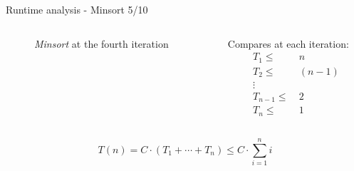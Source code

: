 \begin{frame}{Runtime analysis - Minsort 5/10}
  \begin{columns}
    \begin{column}{0.55\textwidth}
      \begin{figure}[!h]%
        \begin{adjustbox}{width=\linewidth}%
        \end{adjustbox}%
        \caption{\textit{Minsort} at the fourth iteration}%
        \label{fig:minsort_brace}%
      \end{figure}
    \end{column}
    \begin{column}{0.40\textwidth}
      Compares at each iteration:
      \begin{align*}
        T_1  \leq &~ n\\
        T_2  \leq &~ (n-1)\\
        {}  \vdots~ &~ {} \\
        T_{n-1}  \leq &~ 2\\
        T_n  \leq &~ 1
      \end{align*}
    \end{column}
  \end{columns}
  \[
    T(n)
      = C \cdot \left(T_1 + \cdots + T_n\right)
      \leq C \cdot \sum \limits^n_{i=1} i
  \]
\end{frame}




